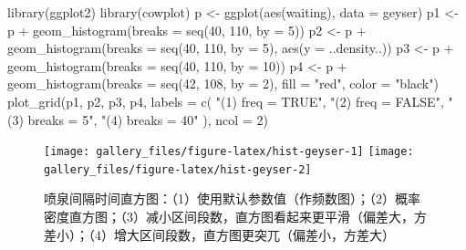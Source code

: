 \documentclass[
  b5paper,
  UTF8,twoside]{book}
\newenvironment{Shaded}{\begin{snugshade}}{\end{snugshade}}
\newcommand{\AttributeTok}[1]{\textcolor[rgb]{0.77,0.63,0.00}{#1}}
\newcommand{\DecValTok}[1]{\textcolor[rgb]{0.00,0.00,0.81}{#1}}
\newcommand{\FunctionTok}[1]{\textcolor[rgb]{0.00,0.00,0.00}{#1}}
\newcommand{\NormalTok}[1]{#1}
\newcommand{\OtherTok}[1]{\textcolor[rgb]{0.56,0.35,0.01}{#1}}
\newcommand{\SpecialCharTok}[1]{\textcolor[rgb]{0.00,0.00,0.00}{#1}}
\newcommand{\StringTok}[1]{\textcolor[rgb]{0.31,0.60,0.02}{#1}}
\begin{document}
\begin{Shaded}
\begin{Highlighting}[]
\FunctionTok{library}\NormalTok{(ggplot2)}
\FunctionTok{library}\NormalTok{(cowplot)}
\NormalTok{p }\OtherTok{\textless{}{-}} \FunctionTok{ggplot}\NormalTok{(}\FunctionTok{aes}\NormalTok{(waiting), }\AttributeTok{data =}\NormalTok{ geyser)}
\NormalTok{p1 }\OtherTok{\textless{}{-}}\NormalTok{ p }\SpecialCharTok{+} \FunctionTok{geom\_histogram}\NormalTok{(}\AttributeTok{breaks =} \FunctionTok{seq}\NormalTok{(}\DecValTok{40}\NormalTok{, }\DecValTok{110}\NormalTok{, }\AttributeTok{by =} \DecValTok{5}\NormalTok{))}
\NormalTok{p2 }\OtherTok{\textless{}{-}}\NormalTok{ p }\SpecialCharTok{+} \FunctionTok{geom\_histogram}\NormalTok{(}\AttributeTok{breaks =} \FunctionTok{seq}\NormalTok{(}\DecValTok{40}\NormalTok{, }\DecValTok{110}\NormalTok{, }\AttributeTok{by =} \DecValTok{5}\NormalTok{), }\FunctionTok{aes}\NormalTok{(}\AttributeTok{y =}\NormalTok{ ..density..))}
\NormalTok{p3 }\OtherTok{\textless{}{-}}\NormalTok{ p }\SpecialCharTok{+} \FunctionTok{geom\_histogram}\NormalTok{(}\AttributeTok{breaks =} \FunctionTok{seq}\NormalTok{(}\DecValTok{40}\NormalTok{, }\DecValTok{110}\NormalTok{, }\AttributeTok{by =} \DecValTok{10}\NormalTok{))}
\NormalTok{p4 }\OtherTok{\textless{}{-}}\NormalTok{ p }\SpecialCharTok{+} \FunctionTok{geom\_histogram}\NormalTok{(}\AttributeTok{breaks =} \FunctionTok{seq}\NormalTok{(}\DecValTok{42}\NormalTok{, }\DecValTok{108}\NormalTok{, }\AttributeTok{by =} \DecValTok{2}\NormalTok{), }\AttributeTok{fill =} \StringTok{"red"}\NormalTok{, }\AttributeTok{color =} \StringTok{"black"}\NormalTok{)}
\FunctionTok{plot\_grid}\NormalTok{(p1, p2, p3, p4, }\AttributeTok{labels =} \FunctionTok{c}\NormalTok{(}
  \StringTok{"(1) freq = TRUE"}\NormalTok{,}
  \StringTok{"(2) freq = FALSE"}\NormalTok{,}
  \StringTok{"(3) breaks = 5"}\NormalTok{,}
  \StringTok{"(4) breaks = 40"}
\NormalTok{), }\AttributeTok{ncol =} \DecValTok{2}\NormalTok{)}
\end{Highlighting}
\end{Shaded}

\begin{figure}

{\centering \texttt{[image: gallery\_files/figure-latex/hist-geyser-1]} \texttt{[image: gallery\_files/figure-latex/hist-geyser-2]} 

}

\caption[喷泉间隔时间直方图]{喷泉间隔时间直方图：（1）使用默认参数值（作频数图）；（2）概率密度直方图；（3）减小区间段数，直方图看起来更平滑（偏差大，方差小）；（4）增大区间段数，直方图更突兀（偏差小，方差大）}\label{fig:hist-geyser}
\end{figure}
\end{document}
